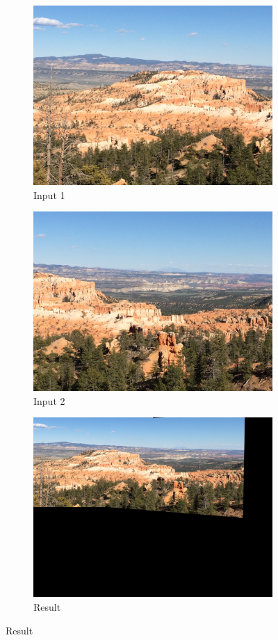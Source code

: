 \documentclass[a4paper,11]{article}
\begin{document}
  \begin{figure}[H]
    \begin{subfigure}{.5\textwidth}
      \centering
      \includegraphics[width=.8\linewidth]{img1_1}
      \caption{Input 1}
    \end{subfigure}
    \begin{subfigure}{.5\textwidth}
      \centering
      \includegraphics[width=.8\linewidth]{img1_2}
      \caption{Input 2}
    \end{subfigure}
    \begin{subfigure}{\textwidth}
      \centering
      \includegraphics[width=.8\linewidth]{mosaic1}
      \caption{Result}
    \end{subfigure}
  \end{figure}
\end{document}
